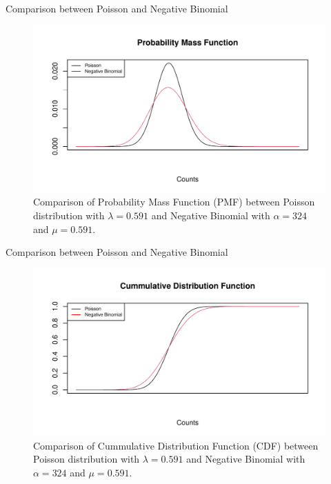 \documentclass[english]{beamer}\usepackage[]{graphicx}\usepackage[]{xcolor}
\makeatletter
\def\maxwidth{ %
  \ifdim\Gin@nat@width>\linewidth
    \linewidth
  \else
    \Gin@nat@width
  \fi
}
\newenvironment{knitrout}{}{} %
\makeatother
\begin{document}
\begin{frame}{Comparison between Poisson and Negative Binomial}
\begin{figure}
\begin{knitrout}
\color{fgcolor}
\includegraphics[width=\maxwidth]{figures/figunnamed-chunk-8-1} 
\end{knitrout}
  \caption{Comparison of Probability Mass Function (PMF) between Poisson distribution with $\lambda = 0.591$ and Negative Binomial with $\alpha = 324$ and $\mu = 0.591$.}
  \label{fig:2_6}
\end{figure}
\end{frame}


\begin{frame}{Comparison between Poisson and Negative Binomial}

\begin{figure}
\begin{knitrout}
\color{fgcolor}
\includegraphics[width=\maxwidth]{figures/figunnamed-chunk-9-1} 
\end{knitrout}
  \caption{Comparison of Cummulative Distribution Function (CDF) between Poisson distribution with $\lambda = 0.591$ and Negative Binomial with $\alpha = 324$ and $\mu = 0.591$.}
  \label{fig:2_7}
\end{figure}

\end{frame}
\end{document}
